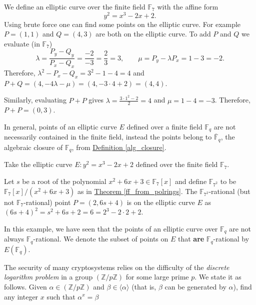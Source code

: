 \documentclass[openany, a4paper, 10pt]{book}
\theoremstyle{plain}
\theoremstyle{plain}
\theoremstyle{plain}
\theoremstyle{definition}
\theoremstyle{plain}
\theoremstyle{definition}
\theoremstyle{remark}
\newcommand{\defref}[1]{\hyperref[#1]{Definition \ref{#1}}}
\newcommand{\theoref}[1]{\hyperref[#1]{Theorem \ref{#1}}}
\begin{document}
\begin{examplebox}
    We define an elliptic curve over the finite field $\mathbb F_7$ with the affine form
    \begin{equation*}
        y^2 = x^3 -2x + 2.
    \end{equation*}
    Using brute force one can find some points on the elliptic curve.
    For example $P=(1, 1)$ and $Q=(4,3)$ are both on the elliptic curve.
    To add $P$ and $Q$ we evaluate (in $\mathbb F_7$)
    \begin{equation*}
        \lambda = \frac{P_y-Q_y}{P_x - Q_x} = \frac{-2}{-3} = \frac{2}{3} = 3, \qquad
        \mu = P_y - \lambda P_x = 1-3 = -2.
    \end{equation*}
    Therefore, $\lambda^2 - P_x - Q_x = 3^2-1-4 = 4$ and $P+Q = (4, -4 \lambda - \mu) = (4, -3\cdot4 + 2) = (4, 4)$.

    Similarly, evaluating $P+P$ gives $\lambda = \frac{3\cdot 1^2-2}{2} = 4$ and $\mu = 1-4=-3$.
    Therefore, $P+P = (0, 3)$.
\end{examplebox}

In general, points of an elliptic curve $E$ defined over a finite field $\mathbb F_q$ are not necessarily contained in the finite field, instead the points belong to $\overline {\mathbb F}_q$, the algebraic closure of $\mathbb F_q$, from \defref{alg_closure}.
\begin{examplebox}
    Take the elliptic curve $E: y^2 = x^3-2x+2$ defined over the finite field $\mathbb F_7$.

    Let $s$ be a root of the polynomial $x^2+6x+3 \in \mathbb F_7[x]$ and define $\mathbb F_{7^2}$ to be $\mathbb F_7[x]/(x^2+6x+3)$ as in \theoref{ff_from_polrings}.
    The $\mathbb F_{7^2}$-rational (but not $\mathbb F_7$-rational) point $P = (2, 6s+4)$ is on the elliptic curve $E$ as $(6s+4)^2 = s^2 + 6s + 2 = 6 = 2^3-2\cdot 2 + 2$.
\end{examplebox}
In this example, we have seen that the points of an elliptic curve over $\mathbb F_q$ are not always $\mathbb F_q$-rational.
We denote the subset of points on $E$ that \textbf{are} $\mathbb F_q$-rational by $E(\mathbb F_q)$.

The security of many cryptosystems relies on the difficulty of the \textit{discrete logarithm problem} in a group $(\mathbb Z/p\mathbb Z)$ for some large prime $p$.
We state it as follows.
Given $\alpha \in (\mathbb Z / p\mathbb Z)$ and $\beta \in \langle \alpha \rangle$ (that is, $\beta$ can be generated by $\alpha$), find any integer $x$ such that $\alpha^x = \beta$
\end{document}
